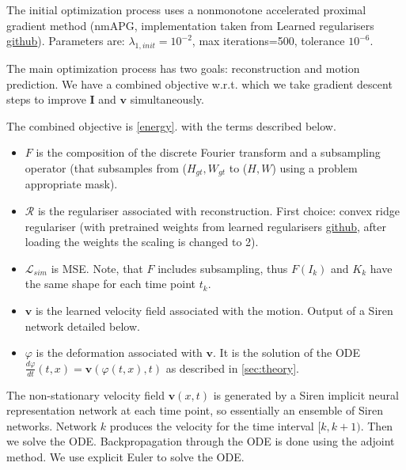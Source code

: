 \documentclass{article}
\begin{document}
The initial optimization process uses a nonmonotone accelerated proximal gradient method (nmAPG, implementation taken from Learned regularisers \href{https://github.com/johertrich/LearnedRegularizers/blob/main/evaluation/nmAPG.py}{github}). Parameters are: $\lambda_{1, init}=10^{-2}$, max iterations=500, tolerance $10^{-6}$.

The main optimization process has two goals: reconstruction and motion prediction. We have a combined objective w.r.t. which we take gradient descent steps to improve $\boldsymbol{I}$ and $\boldsymbol{v}$ simultaneously.

The combined objective is \ref{energy}.
with the terms described below.
\begin{itemize}
    \item $F$ is the composition of the discrete Fourier transform and a subsampling operator (that subsamples from ($H_{gt}, W_{gt}$ to ($H, W$) using a problem appropriate mask).
    \item $\mathcal{R}$ is the regulariser associated with reconstruction. First choice: convex ridge regulariser (with pretrained weights from learned regularisers \href{https://github.com/johertrich/LearnedRegularizers/blob/main/weights/bilevel_CT/CRR_bilevel_JFB_for_CT.pt}{github}, after loading the weights the scaling is changed to 2).
    \item  $\mathcal{L}_{sim}$ is MSE. Note, that $F$ includes subsampling, thus $F(I_k)$ and $K_k$ have the same shape for each time point $t_k$.
    \item $\boldsymbol{v}$ is the learned velocity field associated with the motion. Output of a Siren network detailed below.
    \item $\varphi$ is the deformation associated with $\boldsymbol{v}$. It is the solution of the ODE $\frac{d\varphi}{dt}(t,x) = \boldsymbol{v}(\varphi(t,x),t)$ as described in \ref{sec:theory}.
\end{itemize}

The non-stationary velocity field $\boldsymbol{v}(x,t)$ is generated by a Siren implicit neural representation network at each time point, so essentially an ensemble of Siren networks. Network $k$ produces the velocity for the time interval $[k,k+1)$. Then we solve the ODE. Backpropagation through the ODE is done using the adjoint method. We use explicit Euler to solve the ODE.
\end{document}
